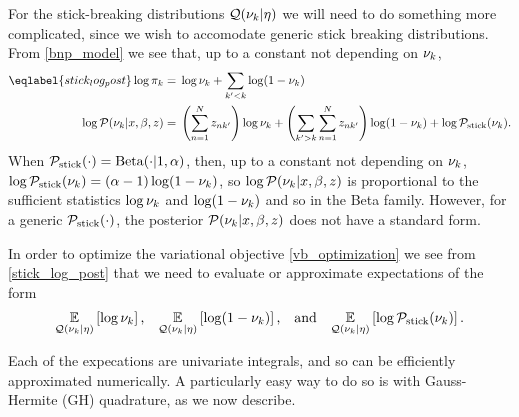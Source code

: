 For the stick-breaking distributions $\mathcal{Q}(\nu_{k} \vert \eta)$ we will need to do
something more complicated, since we wish to accomodate generic stick breaking
distributions.  From \eqref{bnp_model} we see that, up to a constant not
depending on $\nu_{k}$,
%
\begin{align}\eqlabel{stick_log_post}
%
\log \pi_\k ={}&
    \log \nuk + \sum_{\k' < \k} \log (1 - \nuk) \nonumber \\
\logp(\nu_{\k} \vert \x, \beta, \z) ={}&
    \left(\sum_{\n=1}^\N \z_{\n\k'}\right) \log \nuk +
    \left( \sum_{\k' > \k} \sum_{\n=1}^\N \z_{\n\k'} \right) \log (1 - \nuk) +
    \log \pstick(\nuk).
%
\end{align}
%
When $\mathcal{P}_{\mathrm{stick}}(\cdot) = \mathrm{Beta}(\cdot | 1, \alpha)$, then, up to a constant
not depending on $\nu_{k}$, $\log \mathcal{P}_{\mathrm{stick}}(\nu_{k}) = (\alpha - 1) \log (1 -
\nu_{k})$, so $\log \mathcal{P}(\nu_{k} \vert x, \beta, z)$ is proportional to the
sufficient statistics $\log \nu_{k}$ and $\log(1 - \nu_{k})$ and so in the
Beta family.  However, for a generic $\mathcal{P}_{\mathrm{stick}}(\cdot)$, the posterior
$\mathcal{P}(\nu_{k} \vert x, \beta, z)$ does not have a standard form.

In order to optimize the variational objective \eqref{vb_optimization} we see
from \eqref{stick_log_post} that we need to evaluate or approximate expectations
of the form
%
\begin{align*}
%
\expect{\q(\nuk \vert \eta)}{\log \nuk}
\textrm{,}\quad
\expect{\q(\nuk \vert \eta)}{\log (1 - \nuk)}
\textrm{,}\quad\textrm{and}\quad
\expect{\q(\nuk \vert \eta)}{\log \pstick(\nuk)}.
%
\end{align*}

Each of the expecations are univariate integrals, and so can be efficiently
approximated numerically.  A particularly easy way to do so is with
Gauss-Hermite (GH) quadrature, as we now describe.

